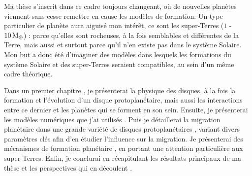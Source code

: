 Ma thèse s'inscrit dans ce cadre toujours changeant, où de nouvelles planètes viennent sans cesse remettre en cause les modèles
de formation. Un type particulier de planète aura aiguisé mon intérêt, ce sont les super-Terres ($1$ - $10\mathrm{\thinspace M_\oplus}$) : parce
qu'elles sont rocheuses, à la fois semblables et différentes de la Terre, mais aussi et surtout parce qu'il n'en existe pas dans
le système Solaire. Mon but a donc été d'imaginer des modèles dans lesquels les formations du système Solaire et des
super-Terres seraient compatibles, au sein d'un même cadre théorique.

Dans un premier chapitre , je présenterai la physique des disques, à la fois la formation et l'évolution d'un
disque protoplanétaire, mais aussi les interactions entre ce dernier et les planètes qui se forment en son sein. Ensuite, je
présenterai les modèles numériques que j'ai utilisés . Puis je détaillerai la migration planétaire dans une
grande variété de disques protoplanétaires , variant divers paramètres clés afin d'en étudier l'influence sur
la migration. Je présenterai des mécanismes de formation planétaire , en portant une attention particulière
aux super-Terres. Enfin, je conclurai en récapitulant les résultats principaux de ma thèse et les perspectives qui en découlent
.
